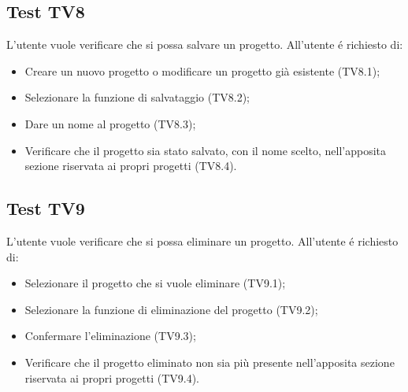 \subsection{Test TV8}
L'utente vuole verificare che si possa salvare un progetto. \newline
All'utente \'e richiesto di:
\begin{itemize}
	\item Creare un nuovo progetto o modificare un progetto già esistente (TV8.1);
	\item Selezionare la funzione di salvataggio (TV8.2);
	\item Dare un nome al progetto (TV8.3);
	\item Verificare che il progetto sia stato salvato, con il nome scelto, nell'apposita sezione riservata ai propri progetti (TV8.4).
\end{itemize}

\subsection{Test TV9}
L'utente vuole verificare che si possa eliminare un progetto. \newline
All'utente \'e richiesto di:
\begin{itemize}
	\item Selezionare il progetto che si vuole eliminare (TV9.1);
	\item Selezionare la funzione di eliminazione del progetto (TV9.2);
	\item Confermare l'eliminazione (TV9.3);
	\item Verificare che il progetto eliminato non sia più presente nell'apposita sezione riservata ai propri progetti (TV9.4).
\end{itemize}